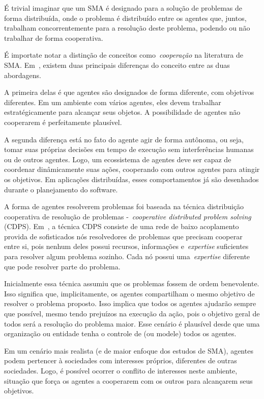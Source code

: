 É trivial imaginar que um SMA é designado para a solução de problemas de forma distribuída, onde o problema é distribuído entre os agentes que, juntos, trabalham concorrentemente para a resolução deste problema, podendo ou não trabalhar de forma cooperativa.

É importate notar a distinção de conceitos como~\emph{cooperação} na literatura de SMA. Em~\cite{wooldridge04}, existem duas principais diferenças do conceito entre as duas abordagens.

A primeira delas é que agentes são designados de forma diferente, com objetivos diferentes. Em um ambiente com vários agentes, eles devem trabalhar estratégicamente para alcançar seus objetos. A possibilidade de agentes não cooperarem é perfeitamente plausível.

A segunda diferença está no fato do agente agir de forma autônoma, ou seja, tomar suas próprias decisões em tempo de execução sem interferências humanas ou de outros agentes. Logo, um ecossistema de agentes deve ser capaz de coordenar dinâmicamente suas ações, cooperando com outros agentes para atingir os objetivos. Em aplicações distribuídas, esses comportamentos já são desenhados durante o planejamento do software.

A forma de agentes resolverem problemas foi baseada na técnica distribuição cooperativa de resolução de problemas -~\emph{cooperative distributed problem solving} (CDPS). Em~\cite{durfee89}, a técnica CDPS consiste de uma rede de baixo acoplamento provida de sofisticados nós resolvedores de problemas que precisam cooperar entre si, pois nenhum deles possui recursos, informações e~\emph{expertise} suficientes para resolver algum problema sozinho. Cada nó possui uma~\emph{expertise} diferente que pode resolver parte do problema.

Inicialmente essa técnica assumiu que os problemas fossem de ordem benevolente. Isso significa que, implicitamente, os agentes compartilham o mesmo objetivo de resolver o problema proposto. Isso implica que todos os agentes ajudarão sempre que possível, mesmo tendo prejuízos na execução da ação, pois o objetivo geral de todos será a resolução do problema maior. Esse cenário é plausível desde que uma organização ou entidade tenha o controle de (ou modele) todos os agentes.

Em um cenário mais realista (e de maior enfoque dos estudos de SMA), agentes podem pertencer à sociedades com interesses próprios, diferentes de outras sociedades. Logo, é possível ocorrer o conflito de interesses neste ambiente, situação que força os agentes a cooperarem com os outros para alcançarem seus objetivos.

